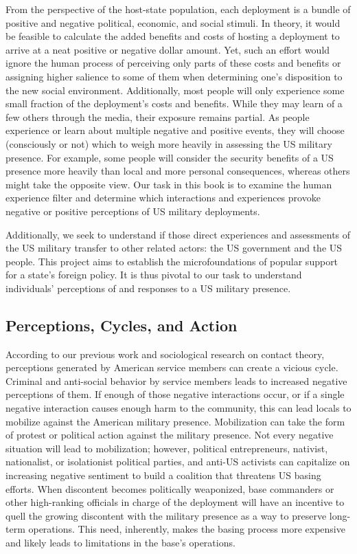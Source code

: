 From the perspective of the host-state population, each deployment is a bundle of positive and negative political, economic, and social stimuli. In theory, it would be feasible to calculate the added benefits and costs of hosting a deployment to arrive at a neat positive or negative dollar amount. Yet, such an effort would ignore the human process of perceiving only parts of these costs and benefits or assigning higher salience to some of them when determining one's disposition to the new social environment. Additionally, most people will only experience some small fraction of the deployment's costs and benefits. While they may learn of a few others through the media, their exposure remains partial. As people experience or learn about multiple negative and positive events, they will choose (consciously or not) which to weigh more heavily in assessing the US military presence. For example, some people will consider the security benefits of a US presence more heavily than local and more personal consequences, whereas others might take the opposite view. Our task in this book is to examine the human experience filter and determine which interactions and experiences provoke negative or positive perceptions of US military deployments.

Additionally, we seek to understand if those direct experiences and assessments of the US military transfer to other related actors: the US government and the US people. This project aims to establish the microfoundations of popular support for a state's foreign policy. It is thus pivotal to our task to understand individuals' perceptions of and responses to a US military presence.



\subsection*{Perceptions, Cycles, and Action}


According to our previous work and sociological research on contact theory, perceptions generated by American service members can create a vicious cycle. Criminal and anti-social behavior by service members leads to increased negative perceptions of them. If enough of those negative interactions occur, or if a single negative interaction causes enough harm to the community, this can lead locals to mobilize against the American military presence.  Mobilization can take the form of protest or political action against the military presence. Not every negative situation will lead to mobilization; however, political entrepreneurs, nativist, nationalist, or isolationist political parties, and anti-US activists can capitalize on increasing negative sentiment to build a coalition that threatens US basing efforts. When discontent becomes politically weaponized, base commanders or other high-ranking officials in charge of the deployment will have an incentive to quell the growing discontent with the military presence as a way to preserve long-term operations. This need, inherently, makes the basing process more expensive and likely leads to limitations in the base's operations. 

